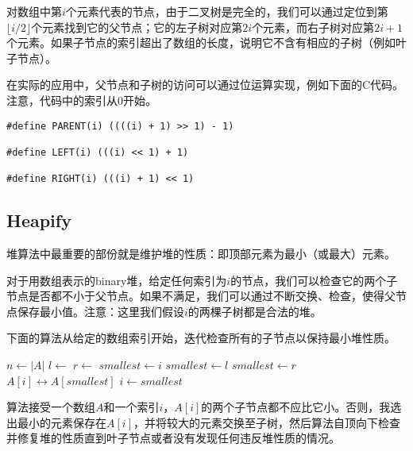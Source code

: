 \documentclass[UTF8]{article}
\begin{document}
对数组中第$i$个元素代表的节点，由于二叉树是完全的，我们可以通过定位到第$\lfloor i/2 \rfloor$个元素找到它的父节点；它的左子树对应第$2i$个元素，而右子树对应第$2i+1$个元素。如果子节点的索引超出了数组的长度，说明它不含有相应的子树（例如叶子节点）。

在实际的应用中，父节点和子树的访问可以通过位运算实现，例如下面的C代码。注意，代码中的索引从0开始。

\lstset{language=C}
\begin{lstlisting}
#define PARENT(i) ((((i) + 1) >> 1) - 1)

#define LEFT(i) (((i) << 1) + 1)

#define RIGHT(i) (((i) + 1) << 1)
\end{lstlisting}

\subsection{Heapify}

堆算法中最重要的部份就是维护堆的性质：即顶部元素为最小（或最大）元素。

对于用数组表示的binary堆，给定任何索引为$i$的节点，我们可以检查它的两个子节点是否都不小于父节点。如果不满足，我们可以通过不断交换、检查，使得父节点保存最小值\cite{CLRS}。注意：这里我们假设$i$的两棵子树都是合法的堆。

下面的算法从给定的数组索引开始，迭代检查所有的子节点以保持最小堆性质。

\begin{algorithmic}[1]
  \State $n \gets |A|$
  \Loop
    \State $l \gets$ 
    \State $r \gets$ 
    \State $smallest \gets i$
      \State $smallest \gets l$
    \EndIf
      \State $smallest \gets r$
    \EndIf
      \State {} $A[i] \leftrightarrow A[smallest]$
      \State $i \gets smallest$
    \Else
      \State \Return
    \EndIf
  \EndLoop
\EndFunction
\end{algorithmic}

算法接受一个数组$A$和一个索引$i$，$A[i]$的两个子节点都不应比它小。否则，我选出最小的元素保存在$A[i]$，并将较大的元素交换至子树，然后算法自顶向下检查并修复堆的性质直到叶子节点或者没有发现任何违反堆性质的情况。
\end{document}
